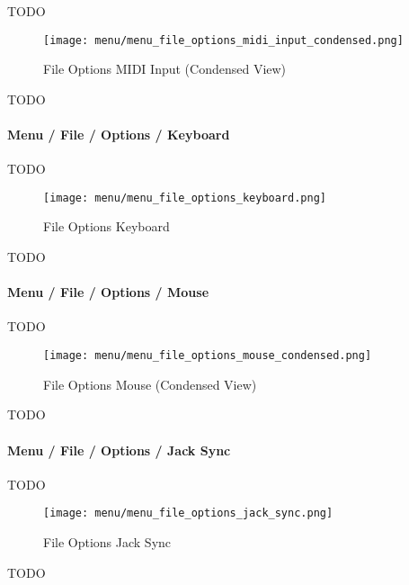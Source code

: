   TODO

\begin{figure}[H]
   \centering 
   \texttt{[image: menu/menu\_file\_options\_midi\_input\_condensed.png]}
   \caption{File Options MIDI Input (Condensed View)}
   \label{fig:seq24_menu_file_options_midi_input}
\end{figure}

   TODO

\paragraph{Menu / File / Options / Keyboard }
\label{paragraph:seq24_menu_file_options_keyboard}

   TODO

\begin{figure}[H]
   \centering 
   \texttt{[image: menu/menu\_file\_options\_keyboard.png]}
   \caption{File Options Keyboard}
   \label{fig:seq24_menu_file_options_keyboard}
\end{figure}

   TODO

\paragraph{Menu / File / Options / Mouse }
\label{paragraph:seq24_menu_file_options_mouse}

   TODO

\begin{figure}[H]
   \centering 
   \texttt{[image: menu/menu\_file\_options\_mouse\_condensed.png]}
   \caption{File Options Mouse (Condensed View)}
   \label{fig:seq24_menu_file_options_mouse}
\end{figure}

   TODO

\paragraph{Menu / File / Options / Jack Sync }
\label{paragraph:seq24_menu_file_options_jack_sync}

   TODO

\begin{figure}[H]
   \centering 
   \texttt{[image: menu/menu\_file\_options\_jack\_sync.png]}
   \caption{File Options Jack Sync}
   \label{fig:seq24_menu_file_options_jack_sync}
\end{figure}

   TODO

